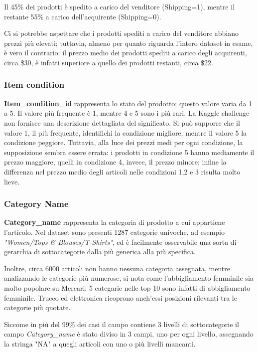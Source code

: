 Il 45\% dei prodotti è spedito a carico del venditore (Shipping=1), mentre il
restante 55\% a carico dell'acquirente (Shipping=0).

Ci si potrebbe aspettare che i prodotti spediti a carico del venditore abbiano
prezzi più elevati; tuttavia, almeno per quanto riguarda l'intero dataset in
esame, è vero il contrario: il prezzo medio dei prodotti spediti a carico degli
acquirenti, circa \$30, è infatti superiore a quello dei prodotti restanti,
circa \$22.


\subsubsection{Item condition}
\textbf{Item\_condition\_id} rappresenta lo stato del prodotto; questo valore
varia da 1 a 5. Il valore più frequente è 1, mentre 4 e 5 sono i più rari. La
Kaggle challenge non fornisce una descrizione dettagliata del significato. Si
può supporre che il valore 1, il più frequente, identifichi la condizione
migliore, mentre il valore 5 la condizione peggiore. Tuttavia, alla luce dei
prezzi medi per ogni condizione, la supposizione sembra essere errata: i
prodotti in condizione 5 hanno mediamente il prezzo maggiore, quelli in
condizione 4, invece, il prezzo minore; infine la differenza nel prezzo medio
degli articoli nelle condizioni 1,2 e 3 risulta molto lieve.
\subsubsection{Category Name}
\textbf{Category\_name} rappresenta la categoria di prodotto a cui appartiene l'articolo. Nel dataset
sono presenti 1287 categorie univoche, ad esempio \textit{"Women/Tops \&
Blouses/T-Shirts"}, ed è facilmente osservabile una sorta di gerarchia di
sottocategorie dalla più generica alla più specifica.

Inoltre, circa 6000 articoli non hanno nessuna categoria assegnata, mentre
analizzando le categorie più numerose, si nota come l'abbigliamento
femminile sia molto popolare su Mercari: 5 categarie nelle top 10 sono infatti
di abbigliamento femminile. Trucco ed elettronica ricoprono anch'essi posizioni
rilevanti tra le categorie più quotate.

Siccome in più del 99\% dei casi il campo contiene 3 livelli di sottocategorie
il campo \textit{Category\_name} è stato diviso in 3 campi, uno per ogni livello,
assegnando la stringa "NA" a quegli articoli con uno o più livelli mancanti.
